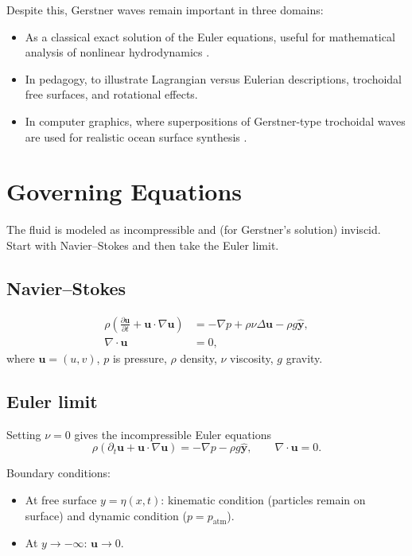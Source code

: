 \documentclass[11pt]{article}
\begin{document}
Despite this, Gerstner waves remain important in three domains:
\begin{itemize}
    \item As a classical exact solution of the Euler equations, useful for mathematical analysis of nonlinear hydrodynamics \cite{craik2004origins,constantin2001gerstner}.
    \item In pedagogy, to illustrate Lagrangian versus Eulerian descriptions, trochoidal free surfaces, and rotational effects.
    \item In computer graphics, where superpositions of Gerstner-type trochoidal waves are used for realistic ocean surface synthesis \cite{tessendorf2001simulating}.
\end{itemize}

\section{Governing Equations}
The fluid is modeled as incompressible and (for Gerstner's solution) inviscid. Start with Navier--Stokes and then take the Euler limit.

\subsection{Navier--Stokes}
\begin{align}
\rho \left( \frac{\partial \mathbf{u}}{\partial t} + \mathbf{u}\cdot\nabla\mathbf{u} \right) 
 &= - \nabla p + \rho \nu \Delta \mathbf{u} - \rho g \hat{\mathbf{y}}, \\
\nabla\cdot \mathbf{u} &= 0,
\end{align}
where $\mathbf{u}=(u,v)$, $p$ is pressure, $\rho$ density, $\nu$ viscosity, $g$ gravity.

\subsection{Euler limit}
Setting $\nu=0$ gives the incompressible Euler equations
\begin{equation}
\rho \left( \partial_t \mathbf{u} + \mathbf{u}\cdot\nabla\mathbf{u} \right) = - \nabla p - \rho g \hat{\mathbf{y}}, 
\qquad \nabla \cdot \mathbf{u} = 0.
\end{equation}

Boundary conditions:
\begin{itemize}
\item At free surface $y=\eta(x,t)$: kinematic condition (particles remain on surface) and dynamic condition ($p=p_{\mathrm{atm}}$).
\item At $y\to -\infty$: $\mathbf{u}\to 0$.
\end{itemize}
\end{document}
